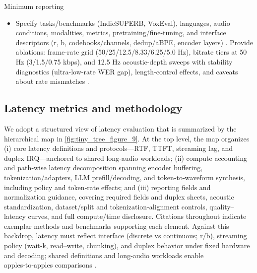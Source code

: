 \documentclass{article}
\begin{document}
Minimum reporting
\begin{itemize}
  \item Specify tasks/benchmarks (IndicSUPERB, VoxEval), languages, audio conditions, modalities, metrics, pretraining/fine-tuning, and interface descriptors (r, b, codebooks/channels, dedup/aBPE, encoder layers) \cite{cui2025voxevalbenchmarkingknowledgeunderstandin,entry2025indicsuperbspeechprocessinguniversalperf,ji2025languagecodecbridgingdiscreterepresentat,zhang2025impactframeratesspeechtokenizercasestudy,huang2024repcodecspeechrepresentationcodectokeniz}. Provide ablations: frame-rate grid (50/25/12.5/8.33/6.25/5.0 Hz), bitrate tiers at 50 Hz (3/1.5/0.75 kbps), and 12.5 Hz acoustic-depth sweeps with stability diagnostics (ultra-low-rate WER gap), length-control effects, and caveats about rate mismatches \cite{poli2025fastabxlibraryefficientcomputationabxdis,vashishth2024stabspeechtokenizerassessmentbenchmark,maimon2025salmonsuiteacousticlanguagemodelevaluati,wang2025tadicodectextawarediffusionspeechtokeniz,hsu2024exploringcontextlearningtextlessspeechla,li2024investigatingneuralaudiocodecsspeechlang}.
\end{itemize}

\subsection{Latency metrics and methodology} \label{subsec:Latency metrics and methodology}
We adopt a structured view of latency evaluation that is summarized by the hierarchical map in \autoref{fig:tiny_tree_figure_9}. At the top level, the map organizes (i) core latency definitions and protocols—RTF, TTFT, streaming lag, and duplex IRQ—anchored to shared long‑audio workloads; (ii) compute accounting and path‑wise latency decomposition spanning encoder buffering, tokenization/adapters, LLM prefill/decoding, and token‑to‑waveform synthesis, including policy and token‑rate effects; and (iii) reporting fields and normalization guidance, covering required fields and duplex sheets, acoustic standardization, dataset/split and tokenization‑alignment controls, quality–latency curves, and full compute/time disclosure. Citations throughout indicate exemplar methods and benchmarks supporting each element. Against this backdrop, latency must reflect interface (discrete vs continuous; r/b), streaming policy (wait‑k, read–write, chunking), and duplex behavior under fixed hardware and decoding; shared definitions and long‑audio workloads enable apples‑to‑apples comparisons \cite{li2025televaldynamicbenchmarkdesignedspokenlan}.
\end{document}
